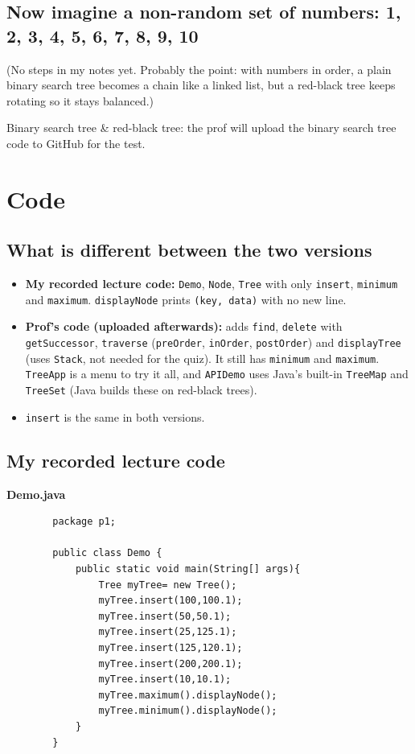 \documentclass[11pt]{article}
\begin{document}
	\subsection{Now imagine a non-random set of numbers: 1, 2, 3, 4, 5, 6, 7, 8, 9, 10}
	(No steps in my notes yet. Probably the point: with numbers in order, a plain binary search tree becomes a chain like a linked list, but a red-black tree keeps rotating so it stays balanced.)
	
	Binary search tree \& red-black tree: the prof will upload the binary search tree code to GitHub for the test.
	
	\newpage
	\section{Code}
	
	\subsection{What is different between the two versions}
	\begin{itemize}
		\item \textbf{My recorded lecture code:} \texttt{Demo}, \texttt{Node}, \texttt{Tree} with only \texttt{insert}, \texttt{minimum} and \texttt{maximum}. \texttt{displayNode} prints \texttt{(key, data)} with no new line.
		\item \textbf{Prof's code (uploaded afterwards):} adds \texttt{find}, \texttt{delete} with \texttt{getSuccessor}, \texttt{traverse} (\texttt{preOrder}, \texttt{inOrder}, \texttt{postOrder}) and \texttt{displayTree} (uses \texttt{Stack}, not needed for the quiz). It still has \texttt{minimum} and \texttt{maximum}. \texttt{TreeApp} is a menu to try it all, and \texttt{APIDemo} uses Java's built-in \texttt{TreeMap} and \texttt{TreeSet} (Java builds these on red-black trees).
		\item \texttt{insert} is the same in both versions.
	\end{itemize}
	
	\subsection{My recorded lecture code}
	
	\textbf{Demo.java}
	\begin{lstlisting}
		package p1;
		
		public class Demo {
			public static void main(String[] args){
				Tree myTree= new Tree();
				myTree.insert(100,100.1);
				myTree.insert(50,50.1);
				myTree.insert(25,125.1);
				myTree.insert(125,120.1);
				myTree.insert(200,200.1);
				myTree.insert(10,10.1);
				myTree.maximum().displayNode();
				myTree.minimum().displayNode();
			}
		}
	\end{lstlisting}
	
\end{document}
